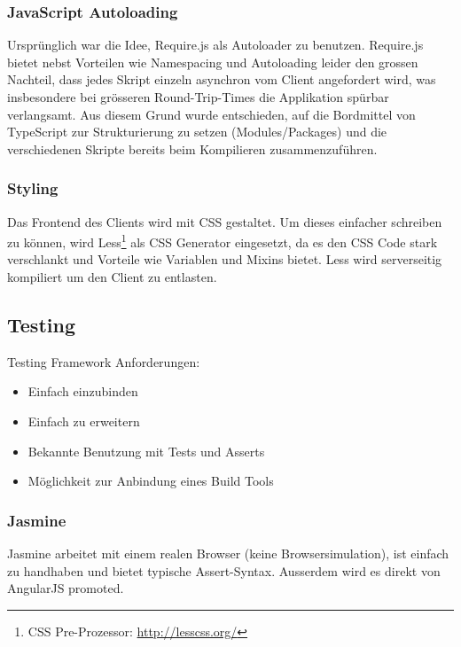 			
			\subsubsection{JavaScript Autoloading}
				Ursprünglich war die Idee, Require.js als Autoloader zu benutzen.
				Require.js bietet nebst Vorteilen wie Namespacing und Autoloading leider den grossen Nachteil,
				dass jedes Skript einzeln asynchron vom Client angefordert wird, 
				was insbesondere bei grösseren Round-Trip-Times die Applikation spürbar verlangsamt.
				Aus diesem Grund wurde entschieden, 
				auf die Bordmittel von TypeScript zur Strukturierung zu setzen (Modules/Packages) 
				und die verschiedenen Skripte bereits beim Kompilieren zusammenzuführen.
				

			\subsubsection{Styling}
				Das Frontend des Clients wird mit CSS gestaltet.
				Um dieses einfacher schreiben zu können,
				wird Less\footnote{CSS Pre-Prozessor: \url{http://lesscss.org/}} als CSS Generator eingesetzt, da es den CSS Code stark verschlankt und Vorteile wie Variablen und Mixins bietet.
				Less wird serverseitig kompiliert um den Client zu entlasten.
				
		\subsection{Testing}
			Testing Framework Anforderungen:
			\begin{itemize}
				\item Einfach einzubinden
				\item Einfach zu erweitern
				\item Bekannte Benutzung mit Tests und Asserts
				\item Möglichkeit zur Anbindung eines Build Tools
			\end{itemize}

			\subsubsection{Jasmine}
				Jasmine arbeitet mit einem realen Browser (keine Browsersimulation), 
				ist einfach zu handhaben und bietet typische Assert-Syntax.
				Ausserdem wird es direkt von AngularJS promoted.
				
				

